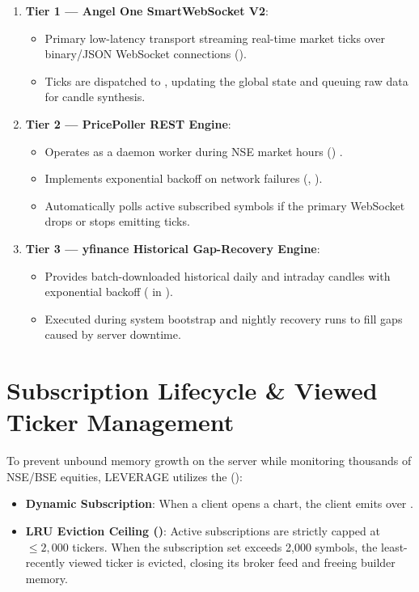 \begin{enumerate}[leftmargin=6mm,itemsep=2mm]
    \item \textbf{Tier 1 --- Angel One SmartWebSocket V2}:
    \begin{itemize}[leftmargin=4mm]
        \item Primary low-latency transport streaming real-time market ticks over binary/JSON WebSocket connections ().
        \item Ticks are dispatched to , updating the global  state and queuing raw data for candle synthesis.
    \end{itemize}
    \item \textbf{Tier 2 --- PricePoller REST Engine}:
    \begin{itemize}[leftmargin=4mm]
        \item Operates as a daemon worker during NSE market hours () \cite{ref:price_poller}.
        \item Implements exponential backoff on network failures (, ).
        \item Automatically polls active subscribed symbols if the primary WebSocket drops or stops emitting ticks.
    \end{itemize}
    \item \textbf{Tier 3 --- yfinance Historical Gap-Recovery Engine}:
    \begin{itemize}[leftmargin=4mm]
        \item Provides batch-downloaded historical daily and intraday candles with exponential backoff ( in ).
        \item Executed during system bootstrap and nightly recovery runs to fill gaps caused by server downtime.
    \end{itemize}
\end{enumerate}

\section{Subscription Lifecycle \& Viewed Ticker Management}
To prevent unbound memory growth on the server while monitoring thousands of NSE/BSE equities, LEVERAGE utilizes the  ():
\begin{itemize}[leftmargin=6mm,itemsep=1.5mm]
    \item \textbf{Dynamic Subscription}: When a client opens a chart, the client emits  over .
    \item \textbf{LRU Eviction Ceiling ()}: Active subscriptions are strictly capped at $\le 2,000$ tickers. When the subscription set exceeds 2,000 symbols, the least-recently viewed ticker is evicted, closing its broker feed and freeing builder memory.
\end{itemize}

